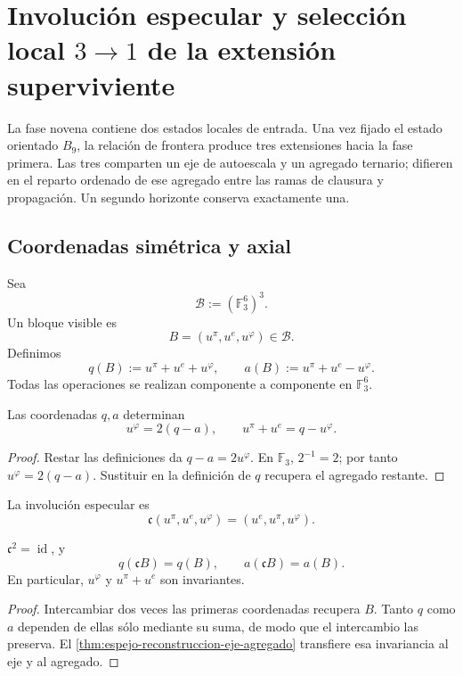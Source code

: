
\chapter{Involución especular y selección local \(3\to1\) de la extensión superviviente}
\label{chap:espejo-seleccion-tres-uno}

La fase novena contiene dos estados locales de entrada. Una vez fijado el
estado orientado \(B_9\), la relación de frontera produce tres extensiones
hacia la fase primera. Las tres comparten un eje de autoescala y un agregado
ternario; difieren en el reparto ordenado de ese agregado entre las ramas de
clausura y propagación. Un segundo horizonte conserva exactamente una.

\section{Coordenadas simétrica y axial}

Sea
\[
 \mathcal B:=(\mathbb F_3^6)^3.
\]
Un bloque visible es
\[
 B=(u^\pi,u^e,u^\varphi)\in\mathcal B.
\]
Definimos
\[
 q(B):=u^\pi+u^e+u^\varphi,
 \qquad
 a(B):=u^\pi+u^e-u^\varphi.
\]
Todas las operaciones se realizan componente a componente en
\(\mathbb F_3^6\).

\begin{theorem}
\label{thm:espejo-reconstruccion-eje-agregado}
Las coordenadas \(q,a\) determinan
\[
 \boxed{u^\varphi=2(q-a),}
 \qquad
 \boxed{u^\pi+u^e=q-u^\varphi.}
\]
\end{theorem}

\begin{proof}
Restar las definiciones da
\(q-a=2u^\varphi\). En \(\mathbb F_3\), \(2^{-1}=2\); por tanto
\(u^\varphi=2(q-a)\). Sustituir en la definición de \(q\) recupera el
agregado restante.
\end{proof}

La involución especular es
\[
 \mathfrak c(u^\pi,u^e,u^\varphi)
 =(u^e,u^\pi,u^\varphi).
\]

\begin{proposition}
\label{prop:espejo-invariantes}
\(\mathfrak c^2=\operatorname{id}\), y
\[
 q(\mathfrak cB)=q(B),
 \qquad
 a(\mathfrak cB)=a(B).
\]
En particular, \(u^\varphi\) y \(u^\pi+u^e\) son invariantes.
\end{proposition}

\begin{proof}
Intercambiar dos veces las primeras coordenadas recupera \(B\). Tanto
\(q\) como \(a\) dependen de ellas sólo mediante su suma, de modo que el
intercambio las preserva. El \cref{thm:espejo-reconstruccion-eje-agregado}
transfiere esa invariancia al eje y al agregado.
\end{proof}

